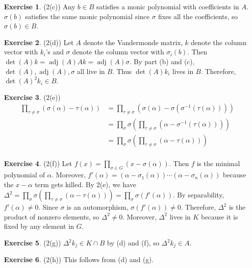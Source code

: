 \documentclass[12pt, psamsfonts]{amsart}
\theoremstyle{definition}
\newtheorem*{exer}{Exercise}
\theoremstyle{remark}
\DeclareMathOperator{\adj}{adj}
\numberwithin{equation}{section}
\begin{document}
\begin{exer}{(2(c))}
  Any $b \in B$ satisfies a monic polynomial with coefficients in $A$.
  $\sigma(b)$ satisfies the same monic polynomial since $\sigma$ fixes all the coefficients, so $\sigma(b) \in B$.
\end{exer}

\begin{exer}{(2(d))}
  Let $A$ denote the Vandermonde matrix, $k$ denote the column vector with $k_i$'s and $\sigma$ denote the column vector with $\sigma_i(b)$.
  Then $\det(A)k = \adj(A)Ak = \adj(A)\sigma$.
  By part (b) and (c), $\det(A), \adj(A), \sigma$ all live in $B$.
  Thus $\det(A)k_i$ lives in $B$.
  Therefore, $\det(A)^2k_i \in B$.
\end{exer}

\begin{exer}{(2(e))}
  $ $
  \begin{align*}
    \prod_{\tau \ne \sigma} (\sigma(\alpha) - \tau(\alpha))
      &= \prod_{\tau \ne \sigma} (\sigma(\alpha) - \sigma(\sigma^{-1}(\tau(\alpha)))) \\
      &= \prod_{\sigma} \sigma(\prod_{\tau \ne \sigma} (\alpha - \sigma^{-1}(\tau(\alpha)))) \\
      &= \prod_{\sigma} \sigma(\prod_{\tau \ne \sigma} (\alpha - \tau(\alpha))) \\
  \end{align*}
\end{exer}

\begin{exer}{(2(f))}
  Let $f(x) = \prod_{\sigma \in G} (x - \sigma(\alpha))$.
  Then $f$ is the minimal polynomial of $\alpha$.
  Moreover, $f'(\alpha) = (\alpha - \sigma_1(\alpha)) \cdots (\alpha - \sigma_n(\alpha))$ because the $x - \alpha$ term gets killed.
  By 2(e), we have $\Delta^2 = \prod_{\sigma} \sigma(\prod_{\tau \ne \sigma} (\alpha - \tau(\alpha))) = \prod_{\sigma} \sigma(f'(\alpha))$.
  By separability, $f'(\alpha) \ne 0$.
  Since $\sigma$ is an automorphism, $\sigma(f'(\alpha)) \ne 0$.
  Therefore, $\Delta^2$ is the product of nonzero elements, so $\Delta^2 \ne 0$.
  Moreover, $\Delta^2$ lives in $K$ because it is fixed by any element in $G$.
\end{exer}

\begin{exer}{(2(g))}
  $\Delta^2k_j \in K \cap B$ by (d) and (f), so $\Delta^2k_j \in A$.
\end{exer}

\begin{exer}{(2(h))}
  This follows from (d) and (g).
\end{exer}
\end{document}
